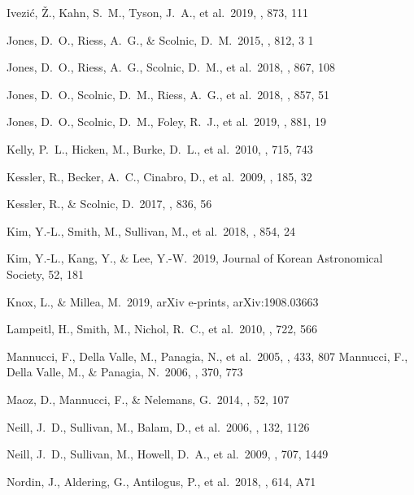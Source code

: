 \documentclass[]{aa} %
\begin{document}
\begin{thebibliography}{}
 Ivezi{\'c}, {\v{Z}}., Kahn, S.~M., Tyson, J.~A., et al.\ 2019, \apj, 873, 111


 Jones, D.~O., Riess, A.~G., \& Scolnic, D.~M.\ 2015, \apj, 812, 3
1

 Jones, D.~O., Riess, A.~G., Scolnic, D.~M., et al.\ 2018, \apj, 867, 108

 Jones, D.~O., Scolnic, D.~M., Riess, A.~G., et al.\ 2018, \apj, 857, 51

 Jones, D.~O., Scolnic, D.~M., Foley, R.~J., et al.\ 2019, \apj, 881, 19

 Kelly, P.~L., Hicken, M., Burke, D.~L., et al.\ 2010, \apj, 715, 743

 Kessler, R., Becker, A.~C., Cinabro, D., et al.\ 2009, \apjs, 185, 32

 Kessler, R., \& Scolnic, D.\ 2017, \apj, 836, 56

 Kim, Y.-L., Smith, M., Sullivan, M., et al.\ 2018, \apj, 854, 24

 Kim, Y.-L., Kang, Y., \& Lee, Y.-W.\ 2019, Journal of Korean Astronomical Society, 52, 181

 Knox, L., \& Millea, M.\ 2019, arXiv e-prints, arXiv:1908.03663

 Lampeitl, H., Smith, M., Nichol, R.~C., et al.\ 2010, \apj, 722, 566

 Mannucci, F.,
  Della Valle, M., Panagia, N., et al.\ 2005, \aap, 433, 807 
 Mannucci, F.,
  Della Valle, M., \& Panagia, N.\ 2006, \mnras, 370, 773 

 Maoz, D., Mannucci,
  F., \& Nelemans, G.\ 2014, \araa, 52, 107 


 Neill, J.~D., Sullivan, M., Balam, D., et al.\ 2006, \aj, 132, 1126

 Neill, J.~D., Sullivan, M., Howell, D.~A., et al.\ 2009, \apj, 707, 1449

 Nordin, J., Aldering, G., Antilogus, P., et al.\ 2018, \aap, 614, A71



\end{thebibliography}
\end{document}
